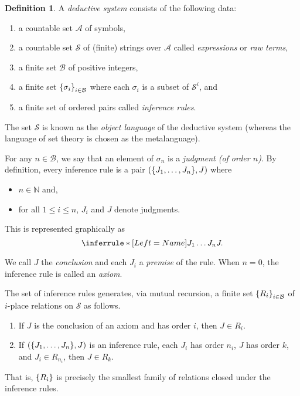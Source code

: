 \documentclass[10pt,letterpaper,cm]{nupset}
\theoremstyle{definition}
\newtheorem{definition}{Definition}[subsection]
\theoremstyle{theorem}
\theoremstyle{remark}
\newcommand{\0}{\mathbf{0}}
\newcommand{\1}{\mathbf{1}}
\newcommand{\2}{\mathbf{2}}
\newcommand{\N}{\mathbb N}
\newcommand{\bi}{\begin{itemize}}
\newcommand{\ei}{\end{itemize}}
\newcommand{\be}{\begin{enumerate}}
\newcommand{\ee}{\end{enumerate}}
\begin{document}
\begin{definition}
A \textit{deductive system} consists  of the following data:
\be[label=(\alph*)]
\item a  countable set $\mathcal{A}$ of symbols,
\item a countable set $\mathcal{S}$ of (finite) strings over $\mathcal{A}$  called \textit{expressions} or \textit{raw terms},
\item a finite set $\mathcal{B}$ of positive integers,
\item a finite set $ \mleft\{\sigma_i\mright\}_{i\in \mathcal{B}}$ where each $\sigma_i$ is a subset of $\mathcal{S}^i$, and
\item a finite set of ordered pairs called \textit{inference rules}.
\ee
The set $\mathcal{S}$ is known as the \textit{object language} of the deductive system (whereas the language of set theory is chosen as the metalanguage).
\end{definition}
\smallskip
For any $n\in \mathcal{B}$, we say that an element of $\sigma_n$ is a \textit{judgment (of order $n$)}.
By definition, every inference rule is a pair $\mleft(\mleft\{J_1, \ldots, J_n\mright\}, J\mright)$ where 
\bi
\item $n\in \N$ and, 
\item for all $1\leq i \leq n$, $J_i$ and $J$ denote judgments.
\ei  This is represented graphically as
\[
\inferrule*[Left = Name]{J_1 \\ \ldots \\ J_n}{J}.
\]

\smallskip

We call $J$ the \textit{conclusion} and each $J_i$ a \textit{premise} of the rule. 
When $n=0$, the inference rule is called an \textit{axiom}. 

\medskip

The set of inference rules generates, via mutual recursion, a finite set $\mleft\{R_i\mright\}_{i\in \mathcal{B}}$ of $i$-place relations on $\mathcal{S}$ as follows.

\be
\item If $J$ is the conclusion of an axiom and has order $i$, then $J\in R_i$.
\item If $\mleft(\mleft\{J_1, \ldots, J_n\mright\}, J\mright)$ is an inference rule, each $J_i$ has order $n_i$, $J$ has order $k$, and $J_i \in R_{n_i}$, then $J \in R_k$. 
\ee  

That is, $\mleft\{R_i\mright\}$ is precisely the smallest family of relations closed under the inference rules.
\end{document}
